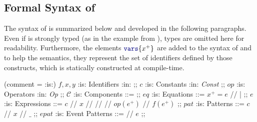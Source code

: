 \subsection{Formal Syntax of \GRSync}
\label{sec:semantics:grsync:syntax}

The syntax of \GRSync is summarized below and developed in the following paragraphs. Even if \GRust
is strongly typed (as in the example from ), types are omitted here for
readability. Furthermore, the elements $\kwf{vars}\{x^+\}$ are added to the syntax of 
and  to help the semantics, they represent the set of identifiers defined by those
constructs, which is statically constructed at compile-time.

\begin{center}
    \begin{bnf}(comment = {:is:})
        $f, x, y$     :is: Identifiers    :in: \idSet ;;
        $c$           :is: Constants      :in: \textit{Const} ;;
        $op$          :is: Operators      :in: \textit{Op} ;;
        $\mathcal{C}$ :is: Components     ::=   ;;
        $eq$          :is: Equations      ::=  $x^+ = e$ //  |  ;;
        $e$           :is: Expressions    ::=  $c$ // $x$ //  //  // $op(e^+)$
        // $f(e^+)$ ;;
        $pat$         :is: Patterns       ::=  $c$ // $x$ // $\_$ ;;
        $epat$        :is: Event Patterns ::=   // $e$ ;;
    \end{bnf}
\end{center}

